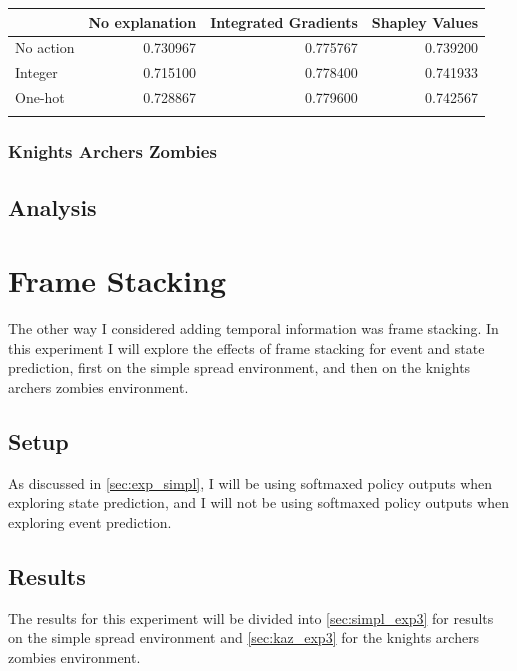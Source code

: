 \documentclass[UKenglish]{uiomasterthesis}
\begin{document}
\begin{center}
\label{tab:event_simpl_lstm}
\begin{tabular}{lrrr}
\toprule
 & No explanation & Integrated Gradients & Shapley Values \\
\midrule
No action & 0.730967 & 0.775767 & 0.739200 \\
Integer & 0.715100 & 0.778400 & 0.741933 \\
One-hot & 0.728867 & 0.779600 & 0.742567 \\
\bottomrule
\addlinespace[2pt]
\multicolumn{3}{l}{\textsuperscript{***}$p<0.001$, 
  \textsuperscript{**}$p<0.01$, 
  \textsuperscript{*}$p<0.05$}
\end{tabular}
\end{center}

\subsubsection{Knights Archers Zombies}


\subsection{Analysis}


\section{Frame Stacking}
\label{sec:exp_stack}
The other way I considered adding temporal information was frame stacking. In this experiment I will explore the effects of frame stacking for event and state prediction, first on the simple spread environment, and then on the knights archers zombies environment. 

\subsection{Setup}
As discussed in \cref{sec:exp_simpl}, I will be using softmaxed policy outputs when exploring state prediction, and I will not be using softmaxed policy outputs when exploring event prediction.

\subsection{Results}
The results for this experiment will be divided into \cref{sec:simpl_exp3} for results on the simple spread environment and \cref{sec:kaz_exp3} for the knights archers zombies environment.
\end{document}
